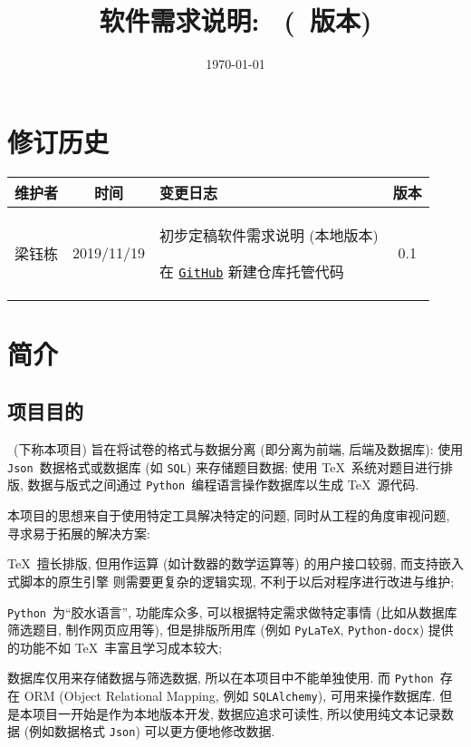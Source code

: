 \documentclass{ctexart}
\title{软件需求说明: \项目名称\ (\项目版本\ 版本)}
\author{\项目组织}
\date{\today}
\newcommand{\github}{\texttt{GitHub}}
\newcommand{\python}{\texttt{Python}}
\newcommand{\pylatex}{\texttt{PyLaTeX}}
\newcommand{\pythondocx}{\python\texttt{-docx}}
\newcommand{\json}{\texttt{Json}}
\newcommand{\sql}{\texttt{SQL}}
\newcommand{\sqlalchemy}{\sql\texttt{Alchemy}}
\begin{document}
\maketitle\tableofcontents\clearpage


\section{修订历史}\label{S:revision-history}
\begin{center}
    \begin{tabularx}{\textwidth}{ccXc}
        \toprule
            维护者 & 时间 & 变更日志 & 版本 \\
        \midrule
        \rowcolor[HTML]{EFEFEF}
            梁钰栋 & 2019/11/19 & \begin{itemize*}[itemjoin={\newline}]
                    \item 初步定稿软件需求说明 (本地版本)
                    \item 在 \href{\项目链接}{\github} 新建仓库托管代码
                \end{itemize*} & 0.1 \\
        \bottomrule
    \end{tabularx}
\end{center}



\section{简介}\label{S:introduction}
\subsection{项目目的}
\ (下称本项目) 旨在将试卷的格式与数据分离 (即分离为前端, 后端及数据库): 使用 \json\ 数据格式或数据库 (如 \sql) 来存储题目数据; 使用 \TeX\ 系统对题目进行排版, 数据与版式之间通过 \python\ 编程语言操作数据库以生成 \TeX\ 源代码.

本项目的思想来自于使用特定工具解决特定的问题, 同时从工程的角度审视问题, 寻求易于拓展的解决方案:
\begin{enumerate*}[label=\textbf{(\arabic*)}]
    \item \TeX\ 擅长排版, 但用作运算 (如计数器的数学运算等) 的用户接口较弱, 而支持嵌入式脚本的原生引擎  则需要更复杂的逻辑实现, 不利于以后对程序进行改进与维护;
    \item \python\ 为``胶水语言'', 功能库众多, 可以根据特定需求做特定事情 (比如从数据库筛选题目, 制作网页应用等), 但是排版所用库 (例如 \pylatex, \pythondocx) 提供的功能不如 \TeX\ 丰富且学习成本较大;
    \item 数据库仅用来存储数据与筛选数据, 所以在本项目中不能单独使用. 而 \python\ 存在 ORM (Object Relational Mapping, 例如 \sqlalchemy\cite{sqlalchemy}), 可用来操作数据库. 但是本项目一开始是作为本地版本开发, 数据应追求可读性, 所以使用纯文本记录数据 (例如数据格式 \json) 可以更方便地修改数据.
\end{enumerate*}
\end{document}
